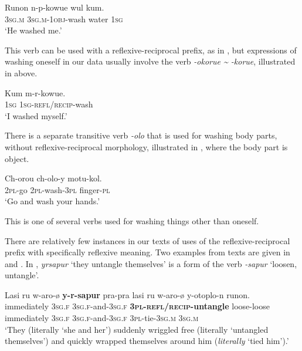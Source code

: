 \documentclass[output=paper]{langscibook}
\begin{document}
\ea%
    \label{ex:Brown:24}
    \gll Runon  n-p-kowue  wul  kum.\\
 \textsc{3sg.m}  \textsc{3sg.m}{}-\textsc{1obj}{}-wash  water  \textsc{1sg}\\
    \glt ‘He washed me.’
    \z

This verb can be used with a reflexive-reciprocal prefix, as in , but expressions of washing oneself in our data usually involve the verb \emph{{}-okorue {\textasciitilde} -korue}, illustrated in  above. 


\ea%
    \label{ex:Brown:25}
    \gll Kum  m-r-kowue.\\
 \textsc{1sg}  \textsc{1sg}{}-\textsc{refl/recip}{}-wash
        \\
    \glt ‘I washed myself.’
    \z

There is a separate transitive verb \emph{-olo} that is used for washing body parts, without reflexive-reciprocal morphology, illustrated in , where the body part is object.


\ea%
    \label{ex:Brown:26}
    \gll Ch-orou  ch-olo-y  motu-kol.\\
 \textsc{2pl}{}-go  \textsc{2pl}{}-wash-\textsc{3pl}  finger-\textsc{pl}\\
    \glt ‘Go and wash your hands.’
    \z

  
 This is one of several verbs used for washing things other than oneself.



  There are relatively few instances in our texts of uses of the reflexive-reciprocal prefix with specifically reflexive meaning. Two examples from texts are given in  and . In , \emph{yrsapur} ‘they untangle themselves’ is a form of the verb \emph{{}-sapur} ‘loosen, untangle’.

\ea%
    \label{ex:Brown:27}
    \gll  Lasi  ru  w-aro-ø  \textbf{y-r-sapur} pra-pra  lasi  ru  w-aro-ø  y-otoplo-n  runon.\\
 immediately  \textsc{3sg.f}  \textsc{3sg.f}{}-and-\textsc{3sg.f}  \textbf{\textsc{3pl}}\textbf{{}-}\textbf{\textsc{refl/recip}}\textbf{{}-untangle}  loose-loose  immediately  \textsc{3sg.f}  \textsc{3sg.f}{}-and-\textsc{3sg.f}  \textsc{3pl}{}-tie-\textsc{3sg.m}  \textsc{3sg.m}\\
    \glt ‘They (literally ‘she and her’) suddenly wriggled free (literally ‘untangled themselves’) and quickly wrapped themselves around him (\emph{literally} ‘tied him’).’
    \z
\end{document}
